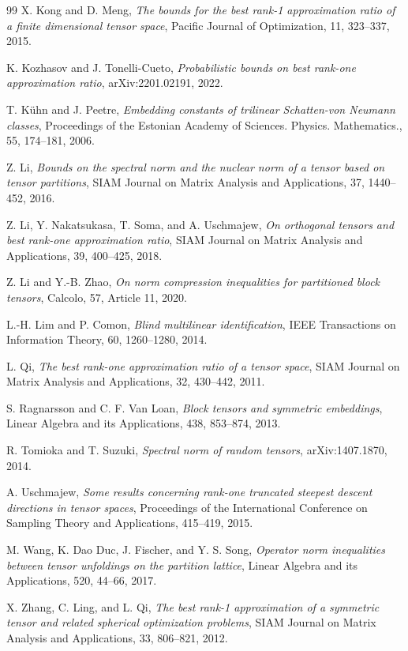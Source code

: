 \documentclass[11pt]{article}
\begin{document}
\begin{thebibliography}{99}
 X. Kong and D. Meng, {\em The bounds for the best rank-1 approximation ratio of a finite dimensional tensor space}, Pacific Journal of Optimization, 11, 323--337, 2015.

 K. Kozhasov and J. Tonelli-Cueto, {\em Probabilistic bounds on best rank-one approximation ratio}, arXiv:2201.02191, 2022.

 T. K\"uhn and J. Peetre, {\em Embedding constants of trilinear Schatten-von Neumann classes}, Proceedings of the Estonian Academy of Sciences. Physics. Mathematics., 55, 174--181, 2006.

 Z. Li, {\em Bounds on the spectral norm and the nuclear norm of a tensor based on tensor partitions}, SIAM Journal on Matrix Analysis and Applications, 37, 1440--452, 2016.

 Z. Li, Y. Nakatsukasa, T. Soma, and A. Uschmajew, {\em On orthogonal tensors and best rank-one approximation ratio}, SIAM Journal on Matrix Analysis and Applications, 39, 400--425, 2018.

 Z. Li and Y.-B. Zhao, {\em On norm compression inequalities for partitioned block tensors}, Calcolo, 57, Article 11, 2020.

 L.-H. Lim and P. Comon, {\em Blind multilinear identification}, IEEE Transactions on Information Theory, 60, 1260--1280, 2014.

 L. Qi, {\em The best rank-one approximation ratio of a tensor space}, SIAM Journal on Matrix Analysis and Applications, 32, 430--442, 2011.

 S. Ragnarsson and C. F. Van Loan, {\em Block tensors and symmetric embeddings}, Linear Algebra and its Applications, 438, 853--874, 2013.

 R. Tomioka and T. Suzuki, {\em Spectral norm of random tensors}, arXiv:1407.1870, 2014.

 A. Uschmajew, {\em Some results concerning rank-one truncated steepest descent directions in tensor spaces}, Proceedings of the International Conference on Sampling Theory and Applications, 415--419, 2015.

 M. Wang, K. Dao Duc, J. Fischer, and Y. S. Song, {\em Operator norm inequalities between tensor unfoldings on the partition lattice}, Linear Algebra and its Applications, 520, 44--66, 2017.

 X. Zhang, C. Ling, and L. Qi, {\em The best rank-1 approximation of a symmetric tensor and related spherical optimization problems}, SIAM Journal on Matrix Analysis and Applications, 33, 806--821, 2012.

\end{thebibliography}
\end{document}
